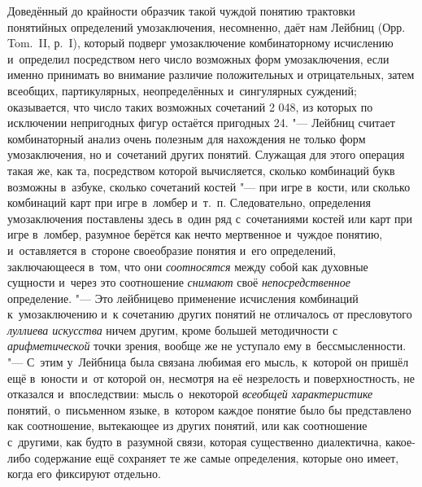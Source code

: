 Доведённый до крайности образчик такой чуждой понятию
трактовки понятийных определений умозаключения, несомненно, даёт нам Лейбниц
(Орр. Tom.~II, р.~I), который подверг умозаключение
комбинаторному исчислению и~определил посредством него число возможных форм
умозаключения, если именно принимать во внимание различие положительных и
отрицательных, затем всеобщих, партикулярных, неопределённых и~сингулярных
суждений; оказывается, что число таких возможных сочетаний 2 048, из
которых по исключении непригодных фигур остаётся пригодных 24. "---
Лейбниц считает комбинаторный анализ очень полезным для
нахождения не только форм умозаключения, но и~сочетаний других понятий.
Служащая для этого операция такая же, как та, посредством которой
вычисляется, сколько комбинаций букв возможны в~азбуке, сколько сочетаний
костей "--- при игре в~кости, или сколько комбинаций карт при
игре в~ломбер и~т.~п. Следовательно, определения умозаключения поставлены
здесь в~один ряд с~сочетаниями костей или карт при игре в~ломбер, разумное
берётся как нечто мертвенное и~чуждое понятию, и~оставляется в~стороне
своеобразие понятия и~его определений, заключающееся в~том, что они
{\em соотносятся} между
собой как духовные сущности и~через это соотношение
{\em снимают} своё
{\em непосредственное}
определение. "--- Это лейбницево
применение исчисления комбинаций к~умозаключению и~к сочетанию других
понятий не отличалось от пресловутого
{\em луллиева искусства}
ничем другим, кроме большей методичности с
{\em арифметической}
точки зрения, вообще же не уступало ему в~бессмысленности. "---
С~этим у~Лейбница была связана любимая его мысль, к~которой
он пришёл ещё в~юности и~от которой он, несмотря на её незрелость и
поверхностность, не отказался и~впоследствии: мысль о~некоторой
{\em всеобщей характеристике}
понятий, о~письменном языке, в~котором каждое понятие было бы
представлено как соотношение, вытекающее из других понятий, или как
соотношение с~другими, как будто в~разумной связи, которая существенно
диалектична, какое-либо содержание ещё сохраняет те же самые определения,
которые оно имеет, когда его фиксируют отдельно.

